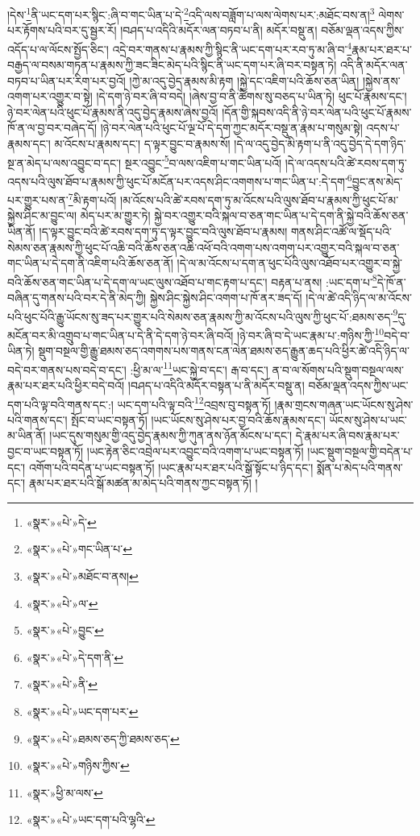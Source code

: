 །དེས་\footnote{«སྣར་»«པེ་»དེ་}ནི་ཡང་དག་པར་སྙིང་:ཞི་བ་གང་ཡིན་པ་དེ་\footnote{«སྣར་»«པེ་»གང་ཡིན་པ་}འདི་ལས་བཟློག་པ་ལས་ལེགས་པར་:མཐོང་བས་ན།\footnote{«སྣར་»«པེ་»མཐོང་བ་ནས།} ལེགས་པར་རྟོགས་པའི་བར་དུ་སྦྱར་རོ། །བཤད་པ་འདིའི་མདོར་ལན་བཏབ་པ་ནི། མདོར་བསྡུ་ན། བཅོམ་ལྡན་འདས་ཀྱིས་འདོད་པ་ལ་ལོངས་སྤྱོད་ཅིང་། འདྲེ་བར་གནས་པ་རྣམས་ཀྱི་སྙིང་ནི་ཡང་དག་པར་རབ་ཏུ་མ་ཞི་བ་\footnote{«སྣར་»«པེ་»ལ་}རྣམ་པར་ཐར་པ་བརྒྱད་ལ་བསམ་གཏན་པ་རྣམས་ཀྱི་ཟང་ཟིང་མེད་པའི་སྙིང་ནི་ཡང་དག་པར་ཞི་བར་བསྟན་ཏེ། འདི་ནི་མདོར་ལན་བཏབ་པ་ཡིན་པར་རིག་པར་བྱའོ། །ཀྱེ་མ་འདུ་བྱེད་རྣམས་མི་རྟག །སྐྱེ་དང་འཇིག་པའི་ཆོས་ཅན་ཡིན། །སྐྱེས་ནས་འགག་པར་འགྱུར་བ་སྟེ། །དེ་དག་ཉེ་བར་ཞི་བ་བདེ། །ཞེས་བྱ་བ་ནི་ཚིགས་སུ་བཅད་པ་ཡིན་ཏེ། ཕུང་པོ་རྣམས་དང་། ཉེ་བར་ལེན་པའི་ཕུང་པོ་རྣམས་ནི་འདུ་བྱེད་རྣམས་ཞེས་བྱའོ། །དོན་གྱི་སྐབས་འདི་ནི་ཉེ་བར་ལེན་པའི་ཕུང་པོ་རྣམས་ཁོ་ན་ལ་བྱ་བར་བཞེད་དོ། །ཉེ་བར་ལེན་པའི་ཕུང་པོ་ལྔ་པོ་དེ་དག་ཀྱང་མདོར་བསྡུ་ན་རྣམ་པ་གསུམ་སྟེ། འདས་པ་རྣམས་དང་། མ་འོངས་པ་རྣམས་དང་། ད་ལྟར་བྱུང་བ་རྣམས་སོ། །དེ་ལ་འདུ་བྱེད་མི་རྟག་པ་ནི་འདུ་བྱེད་དེ་དག་ཉིད་སྔ་ན་མེད་པ་ལས་འབྱུང་བ་དང་། སྔར་འབྱུང་\footnote{«སྣར་»«པེ་»བྱུང་}བ་ལས་འཇིག་པ་གང་ཡིན་པའོ། །དེ་ལ་འདས་པའི་ཚེ་རབས་དག་ཏུ་འདས་པའི་ལུས་ཐོབ་པ་རྣམས་ཀྱི་ཕུང་པོ་མངོན་པར་འདས་ཤིང་འགགས་པ་གང་ཡིན་པ་:དེ་དག་\footnote{«སྣར་»«པེ་»དེ་དག་ནི་}བྱུང་ནས་མེད་པར་གྱུར་པས་ན་\footnote{«སྣར་»«པེ་»ནི་}མི་རྟག་པའོ། །མ་འོངས་པའི་ཚེ་རབས་དག་ཏུ་མ་འོངས་པའི་ལུས་ཐོབ་པ་རྣམས་ཀྱི་ཕུང་པོ་མ་སྐྱེས་ཤིང་མ་བྱུང་ལ། མེད་པར་མ་གྱུར་ཏེ། སྐྱེ་བར་འགྱུར་བའི་སྐལ་བ་ཅན་གང་ཡིན་པ་དེ་དག་ནི་སྐྱེ་བའི་ཆོས་ཅན་ཡིན་ནོ། །ད་ལྟར་བྱུང་བའི་ཚེ་རབས་དག་ཏུ་ད་ལྟར་བྱུང་བའི་ལུས་ཐོབ་པ་རྣམས། གནས་ཤིང་འཚོ་ལ་སྡོད་པའི་སེམས་ཅན་རྣམས་ཀྱི་ཕུང་པོ་འཆི་བའི་ཆོས་ཅན་འཆི་འཕོ་བའི་འགག་པས་འགག་པར་འགྱུར་བའི་སྐལ་བ་ཅན་གང་ཡིན་པ་དེ་དག་ནི་འཇིག་པའི་ཆོས་ཅན་ནོ། །དེ་ལ་མ་འོངས་པ་དག་ན་ཕུང་པོའི་ལུས་འཐོབ་པར་འགྱུར་བ་སྐྱེ་བའི་ཆོས་ཅན་གང་ཡིན་པ་དེ་དག་ལ་ཡང་ལུས་འཐོབ་པ་གང་རྟག་པ་དང་། བརྟན་པ་ནས། :ཡང་དག་པ་\footnote{«སྣར་»«པེ་»ཡང་དག་པར་}དེ་ཁོ་ན་བཞིན་དུ་གནས་པའི་བར་དེ་ནི་མེད་ཀྱི། སྐྱེས་ཤིང་སྐྱེས་ཤིང་འགག་པ་ཁོ་ནར་ཟད་དོ། །དེ་ལ་ཚེ་འདི་ཉིད་ལ་མ་འོངས་པའི་ཕུང་པོའི་རྒྱུ་ཡོངས་སུ་ཟད་པར་གྱུར་པའི་སེམས་ཅན་རྣམས་ཀྱི་མ་འོངས་པའི་ལུས་ཀྱི་ཕུང་པོ་:ཐམས་ཅད་\footnote{«སྣར་»«པེ་»ཐམས་ཅད་ཀྱི་ཐམས་ཅད་}དུ་མངོན་བར་མི་འགྲུབ་པ་གང་ཡིན་པ་དེ་ནི་དེ་དག་ཉེ་བར་ཞི་བའོ། །ཉེ་བར་ཞི་བ་དེ་ཡང་རྣམ་པ་:གཉིས་ཀྱི་\footnote{«སྣར་»«པེ་»གཉིས་ཀྱིས་}བདེ་བ་ཡིན་ཏེ། སྡུག་བསྔལ་གྱི་རྒྱུ་ཐམས་ཅད་འགགས་པས་གནས་ངན་ལེན་ཐམས་ཅད་རྒྱུན་ཆད་པའི་ཕྱིར་ཚེ་འདི་ཉིད་ལ་བདེ་བར་གནས་པས་བདེ་བ་དང་། :ཕྱི་མ་ལ་\footnote{«སྣར་»ཕྱི་མ་ལས་}ཡང་སྐྱེ་བ་དང་། རྒ་བ་དང་། ན་བ་ལ་སོགས་པའི་སྡུག་བསྔལ་ལས་རྣམ་པར་ཐར་པའི་ཕྱིར་བདེ་བའོ། །བཤད་པ་འདིའི་མདོར་བསྟན་པ་ནི་མདོར་བསྡུ་ན། བཅོམ་ལྡན་འདས་ཀྱིས་ཡང་དག་པའི་ལྟ་བའི་གནས་དང་:། ཡང་དག་པའི་ལྟ་བའི་\footnote{«སྣར་»«པེ་»ཡང་དག་པའི་ལྷའི་}འབྲས་བུ་བསྟན་ཏོ། །རྣམ་གྲངས་གཞན་ཡང་ཡོངས་སུ་ཤེས་པའི་གནས་དང་། སྤོང་བ་ཡང་བསྟན་ཏོ། །ཡང་ཡོངས་སུ་ཤེས་པར་བྱ་བའི་ཆོས་རྣམས་དང་། ཡོངས་སུ་ཤེས་པ་ཡང་མ་ཡིན་ནོ། །ཡང་དུས་གསུམ་གྱི་འདུ་བྱེད་རྣམས་ཀྱི་ཀུན་ནས་ཉོན་མོངས་པ་དང་། དེ་རྣམ་པར་ཞི་བས་རྣམ་པར་བྱང་བ་ཡང་བསྟན་ཏོ། །ཡང་རྟེན་ཅིང་འབྲེལ་པར་འབྱུང་བའི་འགག་པ་ཡང་བསྟན་ཏོ། །ཡང་སྡུག་བསྔལ་གྱི་བདེན་པ་དང་། འགོག་པའི་བདེན་པ་ཡང་བསྟན་ཏོ། །ཡང་རྣམ་པར་ཐར་པའི་སྒོ་སྟོང་པ་ཉིད་དང་། སྨོན་པ་མེད་པའི་གནས་དང་། རྣམ་པར་ཐར་པའི་སྒོ་མཚན་མ་མེད་པའི་གནས་ཀྱང་བསྟན་ཏོ། །
